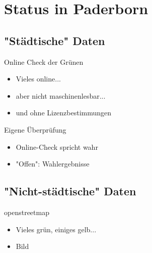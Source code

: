 \section{Status in Paderborn}

\subsection{"Städtische" Daten}
\begin{frame}[t]{Online Check der Grünen}
 \begin{itemize}
  \item Vieles online...
  \item aber nicht maschinenlesbar...
  \item und ohne Lizenzbestimmungen
 \end{itemize}
\end{frame}

\begin{frame}[t]{Eigene Überprüfung}
 \begin{itemize}
  \item Online-Check spricht wahr
  \item "Offen": Wahlergebnisse
 \end{itemize}
\end{frame}

\subsection{"Nicht-städtische" Daten}

\begin{frame}[t]{openstreetmap}
 \begin{itemize}
  \item Vieles grün, einiges gelb...
  \item Bild
 \end{itemize}
\end{frame}